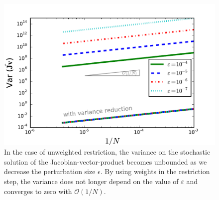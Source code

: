 %
%
%
\begin{figure}
\centering
\includegraphics[width=0.8\linewidth]{../Problems/Particles/checkSystem/plots/Var_N_eps_nw}
\caption[Effect of variance reduction]{In the case of unweighted restriction, the variance on the stochastic solution of the Jacobian-vector-product becomes unbounded as we decrease the perturbation size $\epsilon$. By using weights in the restriction step, the variance does not longer depend on the value of $\varepsilon$ and   converges to zero with $\mathcal{O}(1/ N)$.}
\label{Var_N}
\end{figure}


